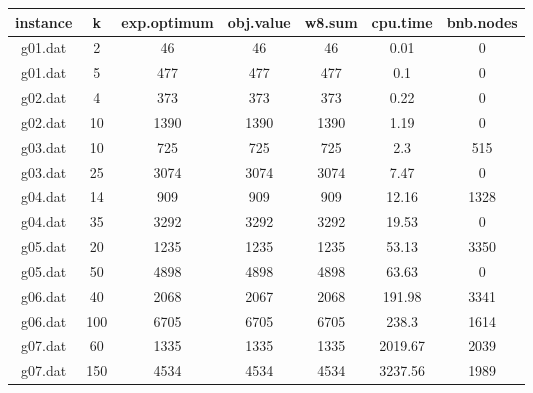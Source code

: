 \begin{tabular}{ c | c | c | c | c | c | c }
	instance & k & exp.optimum & obj.value & w8.sum & cpu.time & bnb.nodes \\ 
	\hline
	g01.dat & 2 & 46 & 46 & 46 & 0.01 & 0 \\
	g01.dat & 5 & 477 & 477 & 477 & 0.1 & 0 \\
	g02.dat & 4 & 373 & 373 & 373 & 0.22 & 0 \\
	g02.dat & 10 & 1390 & 1390 & 1390 & 1.19 & 0 \\
	g03.dat & 10 & 725 & 725 & 725 & 2.3 & 515 \\
	g03.dat & 25 & 3074 & 3074 & 3074 & 7.47 & 0 \\
	g04.dat & 14 & 909 & 909 & 909 & 12.16 & 1328 \\
	g04.dat & 35 & 3292 & 3292 & 3292 & 19.53 & 0 \\
	g05.dat & 20 & 1235 & 1235 & 1235 & 53.13 & 3350 \\
	g05.dat & 50 & 4898 & 4898 & 4898 & 63.63 & 0 \\
	g06.dat & 40 & 2068 & 2067 & 2068 & 191.98 & 3341 \\
	g06.dat & 100 & 6705 & 6705 & 6705 & 238.3 & 1614 \\
	g07.dat & 60 & 1335 & 1335 & 1335 & 2019.67 & 2039 \\
	g07.dat & 150 & 4534 & 4534 & 4534 & 3237.56 & 1989 \\
\end{tabular}
